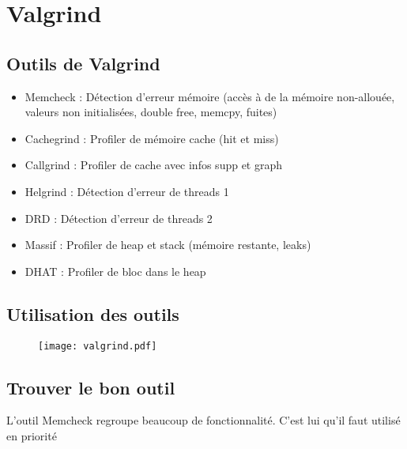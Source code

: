 \section{Valgrind}

\subsection{Outils de Valgrind}
\begin{itemize}
\item Memcheck : Détection d'erreur mémoire (accès à de la mémoire non-allouée, valeurs non initialisées, double free, memcpy, fuites) 
\item Cachegrind : Profiler de mémoire cache (hit et miss)
\item Callgrind : Profiler de cache avec infos supp et graph
\item Helgrind : Détection d'erreur de threads 1
\item DRD : Détection d'erreur de threads 2
\item Massif : Profiler de heap et stack (mémoire restante, leaks)
\item DHAT : Profiler de bloc dans le heap
\end{itemize}

\subsection{Utilisation des outils}
\begin{figure}[H]
    \centering
    \texttt{[image: valgrind.pdf]}
\end{figure}

\subsection{Trouver le bon outil}
L'outil Memcheck regroupe beaucoup de fonctionnalité. C'est lui qu'il faut utilisé en priorité
